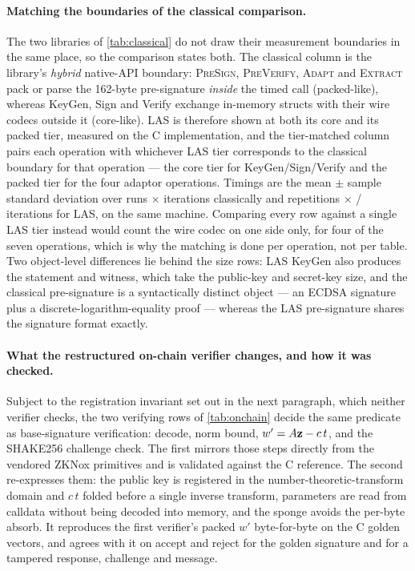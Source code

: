 \paragraph{Matching the boundaries of the classical comparison.}
The two libraries of \cref{tab:classical} do not draw their measurement boundaries in the
same place, so the comparison states both. The classical column is the library's
\emph{hybrid} native-API boundary: \textsc{PreSign}, \textsc{PreVerify}, \textsc{Adapt} and
\textsc{Extract} pack or parse the 162-byte pre-signature \emph{inside} the timed call
(packed-like), whereas KeyGen, Sign and Verify exchange in-memory structs with their wire
codecs outside it (core-like). LAS is therefore shown at both its core and its packed tier,
measured on the C implementation, and the tier-matched column pairs each operation with
whichever LAS tier corresponds to the classical boundary for that operation --- the core
tier for KeyGen/Sign/Verify and the packed tier for the four adaptor operations. Timings
are the mean $\pm$ sample standard deviation over \clReps{} runs $\times$ \clIters{}
iterations classically and \benchReps{} repetitions $\times$
\benchItersSign{}/\benchItersVerify{} iterations for LAS, on the same machine. Comparing every row against a single LAS tier
instead would count the wire codec on one side only, for four of the seven operations,
which is why the matching is done per operation, not per table. Two
object-level differences lie behind the size rows: LAS KeyGen also produces the
statement and witness, which take the public-key and secret-key size, and the classical
pre-signature is a syntactically distinct object --- an ECDSA signature plus a
discrete-logarithm-equality proof --- whereas the LAS pre-signature shares the signature
format exactly.

\paragraph{What the restructured on-chain verifier changes, and how it was checked.}
Subject to the registration invariant set out in the next paragraph, which neither
verifier checks, the two verifying rows of \cref{tab:onchain} decide the
same predicate as
base-signature verification: decode, norm bound, $w'=A\mathbf{z}-c\,t$, and the SHAKE256 challenge
check. The first mirrors those steps directly from the vendored ZKNox primitives and is
validated against the C reference. The second re-expresses them: the public key is
registered in the number-theoretic-transform domain and $c\,t$ folded before a single
inverse transform, parameters are read from calldata without being decoded into memory, and
the sponge avoids the per-byte absorb. It reproduces the first verifier's packed $w'$
byte-for-byte on the C golden vectors, and agrees with it on accept and reject for the
golden signature and for a tampered response, challenge and message.

